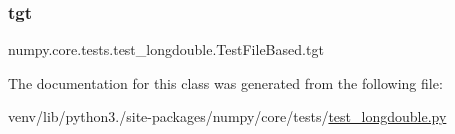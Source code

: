 \subsubsection{\texorpdfstring{tgt}{tgt}}
{\footnotesize\ttfamily numpy.\+core.\+tests.\+test\+\_\+longdouble.\+Test\+File\+Based.\+tgt\hspace{0.3cm}{\ttfamily [static]}}



The documentation for this class was generated from the following file\+:\begin{DoxyCompactItemize}
\item 
venv/lib/python3./site-\/packages/numpy/core/tests/\hyperlink{test__longdouble_8py}{test\+\_\+longdouble.\+py}\end{DoxyCompactItemize}
